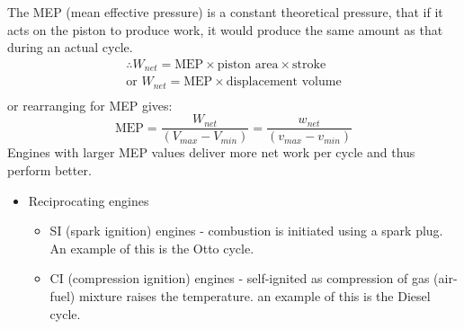 \documentclass[class=report, crop=false, 12pt,a4paper]{standalone}
\begin{document}
The MEP (mean effective pressure) is a constant theoretical pressure, that if it acts on the piston to produce work, it would produce the same amount as that during an actual cycle. 
\begin{gather}
  \therefore W_{net} = \textrm{MEP} \times \textrm{piston area} \times \textrm{stroke}\\
  \textrm{or } W_{net} = \textrm{MEP} \times \textrm{displacement volume}\\
\end{gather}
or rearranging for MEP gives:
\begin{equation}
  \textrm{MEP} = \frac{W_{net}}{(V_{max} - V_{min})} = \frac{w_{net}}{(v_{max} - v_{min})}
\end{equation}
Engines with larger MEP values deliver more net work per cycle and thus perform better. 
\begin{itemize}[noitemsep]
  \item Reciprocating engines
    \begin{itemize}[noitemsep]
      \item SI (spark ignition) engines - combustion is initiated using a spark plug. An example of this is the Otto cycle.
      \item CI (compression ignition) engines - self-ignited as compression of gas (air-fuel) mixture raises the temperature. an example of this is the Diesel cycle.
    \end{itemize}
\end{itemize}
\end{document}
